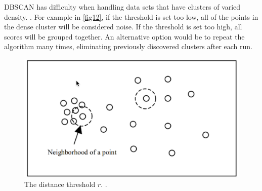 \documentclass[a4paper, 12pt]{article}
\begin{document}




DBSCAN has difficulty when handling data sets that have clusters of varied density.  \citep{ertoz2003finding}. For example in \autoref{fig12}, if the threshold is set too low, all of the points in the dense cluster will be considered noise. If the threshold is set too high, all scores will be grouped together. An alternative option would be to repeat the algorithm many times, eliminating previously discovered clusters after each run.

\begin{figure}[htbp!]
    \centering
    \includegraphics[width=1\textwidth]{DBSCAN disadvantage.png}
    \caption{The distance threshold $r$. \citep{ertoz2003finding}.}
    \label{fig12}
\end{figure}
\end{document}
